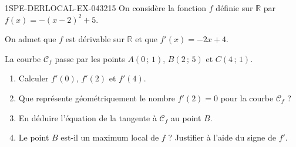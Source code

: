 \begin{exercice}{1SPE-DERLOCAL-EX-043}{2}{15}
On considère la fonction $f$ définie sur $\mathbb{R}$ par $f(x) = -(x-2)^2 + 5$.

On admet que $f$ est dérivable sur $\mathbb{R}$ et que $f'(x) = -2x + 4$.

La courbe $\mathcal{C}_f$ passe par les points $A(0\,;\,1)$, $B(2\,;\,5)$ et $C(4\,;\,1)$.
\begin{enumerate}
\item Calculer $f'(0)$, $f'(2)$ et $f'(4)$.
\item Que représente géométriquement le nombre $f'(2) = 0$ pour la courbe $\mathcal{C}_f$ ?
\item En déduire l'équation de la tangente à $\mathcal{C}_f$ au point $B$.
\item Le point $B$ est-il un maximum local de $f$ ? Justifier à l'aide du signe de $f'$.
\end{enumerate}
\end{exercice}
